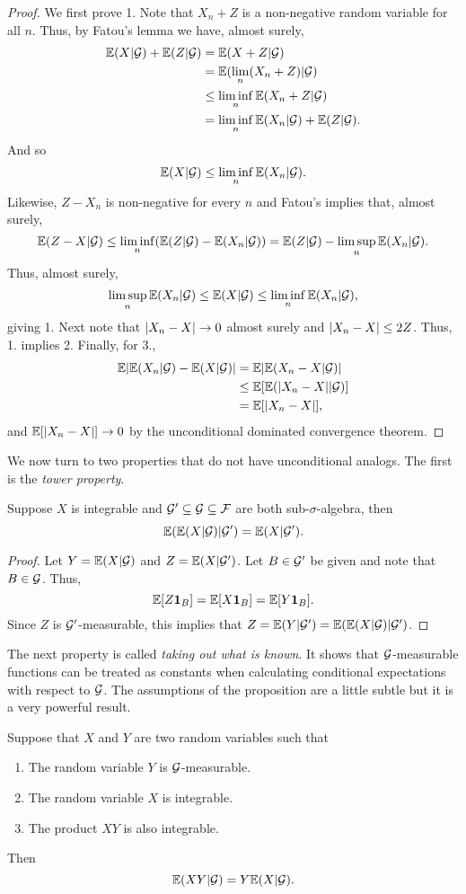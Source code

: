 \begin{proof}
    We first prove 1. Note that $X_n+Z$ is a non-negative random variable for all $n$. Thus, by Fatou's lemma we have, almost surely,
    \begin{align*}
        {\mathbb{E}}(X|{\mathcal{G}})+{\mathbb{E}}(Z|{\mathcal{G}})&={\mathbb{E}}(X+Z|{\mathcal{G}})\\
         &={\mathbb{E}}(\lim_n(X_n+Z)|{\mathcal{G}})\\
        &\le \liminf_n {\mathbb{E}}(X_n+Z|{\mathcal{G}})\\
        &= \liminf_n{\mathbb{E}}(X_n|{\mathcal{G}})+{\mathbb{E}}(Z|{\mathcal{G}}).
    \end{align*}
    And so
    \[{\mathbb{E}}(X|{\mathcal{G}}) \le \liminf_n {\mathbb{E}}(X_n|{\mathcal{G}}). \]
    Likewise, $Z-X_n$ is non-negative for every $n$ and Fatou's implies that, almost surely,
    \[{\mathbb{E}}(Z-X|{\mathcal{G}}) \le \liminf_n({\mathbb{E}}(Z|{\mathcal{G}})-{\mathbb{E}}(X_n|{\mathcal{G}}))={\mathbb{E}}(Z|{\mathcal{G}})-\limsup_n {\mathbb{E}}(X_n|{\mathcal{G}}).  \]
    Thus, almost surely,
    \[\limsup_n {\mathbb{E}}(X_n|{\mathcal{G}}) \le {\mathbb{E}}(X|{\mathcal{G}}) \le \liminf_n {\mathbb{E}}(X_n|{\mathcal{G}}),  \]
    giving 1. Next note that ${\left\lvert X_n-X\right\rvert} \to 0$ almost surely and ${\left\lvert X_n-X\right\rvert} \le 2Z$. Thus, 1. implies 2. Finally, for 3.,
    \begin{align*}
        {\mathbb{E}}{\left\lvert{\mathbb{E}}(X_n|{\mathcal{G}})-{\mathbb{E}}(X|{\mathcal{G}})\right\rvert} &={\mathbb{E}}{\left\lvert{\mathbb{E}}(X_n-X|{\mathcal{G}})\right\rvert}\\
        &\le {\mathbb{E}}[{\mathbb{E}}({\left\lvert X_n-X\right\rvert}|{\mathcal{G}})]\\
        &={\mathbb{E}}[{\left\lvert X_n-X\right\rvert}],
    \end{align*}
    and ${\mathbb{E}}[{\left\lvert X_n-X\right\rvert}]\to 0$ by the unconditional dominated convergence theorem.
\end{proof}
We now turn to two properties that do not have unconditional analogs. The first is the \emph{tower property}.
\begin{proposition}
    Suppose $X$ is integrable and ${\mathcal{G}}' \subseteq {\mathcal{G}} \subseteq {\mathcal{F}}$ are both sub-$\sigma$-algebra, then 
    \[{\mathbb{E}}({\mathbb{E}}(X|{\mathcal{G}})|{\mathcal{G}}') = {\mathbb{E}}(X|{\mathcal{G}}'). \]
\end{proposition}
\begin{proof}
    Let $Y={\mathbb{E}}(X|{\mathcal{G}})$ and $Z =  {\mathbb{E}}(X|{\mathcal{G}}')$. Let $B \in {\mathcal{G}}'$ be given and note that $B \in {\mathcal{G}}$. Thus,
    \[{\mathbb{E}}[Z{{\bf 1}}_B]={\mathbb{E}}[X{{\bf 1}}_B] ={\mathbb{E}}[Y{{\bf 1}}_B]. \]
    Since $Z$ is ${\mathcal{G}}'$-measurable, this implies that $Z = {\mathbb{E}}(Y|{\mathcal{G}}')={\mathbb{E}}({\mathbb{E}}(X|{\mathcal{G}})|{\mathcal{G}}')$.
\end{proof}
The next property is called \emph{taking out what is known}. It shows that ${\mathcal{G}}$-measurable functions can be treated as constants when calculating conditional expectations with respect to ${\mathcal{G}}$. The assumptions of the proposition are a little subtle but it is a very powerful result.
\begin{proposition}
    Suppose that $X$ and $Y$ are two random variables such that 
    \begin{enumerate}
        \item The random variable $Y$ is ${\mathcal{G}}$-measurable.
        \item The random variable $X$ is integrable.
        \item The product $XY$ is also integrable.
    \end{enumerate}
    Then 
    \[{\mathbb{E}}(XY|{\mathcal{G}}) = Y{\mathbb{E}}(X|{\mathcal{G}}). \]
\end{proposition}
